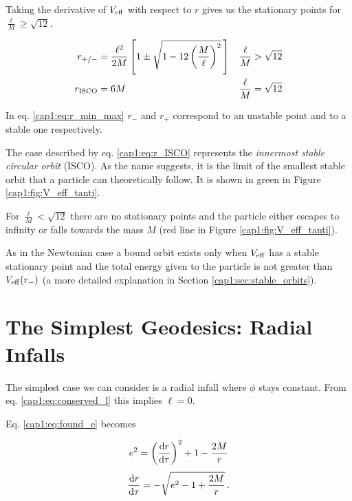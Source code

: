 Taking the derivative of $V_{\rm eff}$ with respect to $r$ gives us the
stationary points for $\frac{\ell}{M} \geq \sqrt{12}$.

\begin{subequations}
\begin{align}
    r_{+ / -} &= \frac{\ell^2}{2 M} \left[1 \pm
    \sqrt{1 - 12 \left( \frac{M}{\ell} \right)^2} \, \right]
    &&\frac{\ell}{M} > \sqrt{12} \label{cap1:eq:r_min_max} \\
    r_{\rm ISCO} &= 6 M
    &&\frac{\ell}{M} = \sqrt{12} \label{cap1:eq:r_ISCO}
\end{align}
\label{cap1:eq:stationary_r}
\end{subequations}

In eq. \ref{cap1:eq:r_min_max} $r_-$ and $r_+$ correspond
to an unstable point and to a stable one respectively.

The case described by eq. \ref{cap1:eq:r_ISCO} represents the
\textit{innermost stable circular orbit} (ISCO).
As the name suggests, it is the limit of the smallest stable orbit that a
particle can theoretically follow.
It is shown in green in Figure \ref{cap1:fig:V_eff_tanti}.

For $\frac{\ell}{M} < \sqrt{12}$ there are no stationary points and the particle
either escapes to infinity or falls towards the mass $M$ (red line in Figure
\ref{cap1:fig:V_eff_tanti}).

As in the Newtonian case a bound orbit exists only when $V_{\rm eff}$ has a
stable stationary point and the total energy given to the particle is not
greater than $V_{\rm eff}(r_-)$ (a more detailed explanation in
Section \ref{cap1:sec:stable_orbits}).


\section{The Simplest Geodesics: Radial Infalls}

The simplest case we can consider is a radial infall where $\phi$ stays
constant.
From eq. \ref{cap1:eq:conserved_l} this implies $\ell = 0$.

Eq. \ref{cap1:eq:found_e} becomes


\begin{equation*}
    e^2 = \left(\dv{r}{\tau}\right)^2 + 1 - \frac{2M}{r}
\end{equation*}
\begin{equation}
    \dv{r}{\tau} = - \sqrt{e^2 - 1 + \frac{2 M}{r}} \, .
    \label{cap1:eq:radial_infall_ODE_1}
\end{equation}

